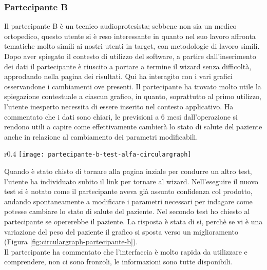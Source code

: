\subsubsection{Partecipante B}
\label{partecipante-b}
Il partecipante B è un tecnico audioprotesista; sebbene non sia un medico ortopedico, questo utente si è reso interessante in quanto nel suo lavoro affronta tematiche molto simili ai nostri utenti in target, con metodologie di lavoro simili.\\
Dopo aver spiegato il contesto di utilizzo del software, a partire dall'inserimento dei dati il partecipante è riuscito a portare a termine il wizard senza difficoltà, approdando nella pagina dei risultati. Qui ha interagito con i vari grafici osservandone i cambiamenti ove presenti. Il partecipante ha trovato molto utile la spiegazione contestuale a ciascun grafico, in quanto, soprattutto al primo utilizzo, l'utente inesperto necessita di essere inserito nel contesto applicativo. Ha commentato che i dati sono chiari, le previsioni a 6 mesi dall'operazione si rendono utili a capire come effettivamente cambierà lo stato di salute del paziente anche in relazione al cambiamento dei parametri modificabili. \\

\begin{wrapfigure}{r}{0.4\textwidth}
    \centering
    \texttt{[image: partecipante-b-test-alfa-circulargraph]}
    \caption{Circulargraph del test Alfa condotto dal partecipante B}
    \caption*{In questo test si è indagato l'ambito dell'operazione all'anca}
    \label{fig:circulargraph-partecipante-b}
\end{wrapfigure}

Quando è stato chisto di tornare alla pagina inziale per condurre un altro test, l'utente ha individuato subito il link per tornare al wizard. Nell'eseguire il nuovo test si è notato come il partecipante aveva già assunto confidenza col prodotto, andando spontaneamente a modificare i parametri necessari per indagare come potesse cambiare lo stato di salute del paziente. Nel secondo test ho chiesto al partecipante se opererebbe il paziente. La risposta è stata di si, perchè se vi è una variazione del peso del paziente il grafico si sposta verso un miglioramento (Figura \ref{fig:circulargraph-partecipante-b}). \\
Il partecipante ha commentato che l'interfaccia è molto rapida da utilizzare e comprendere, non ci sono fronzoli, le informazioni sono tutte disponibili. \\

